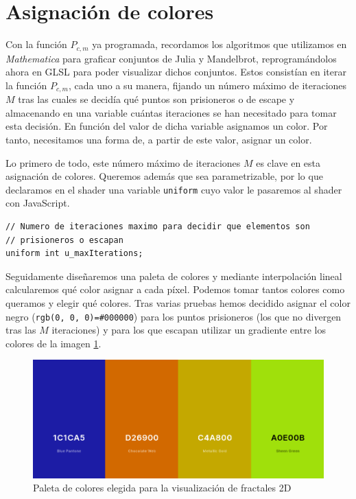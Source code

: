 \section{Asignación de colores}
\label{section:colores}

Con la función $P_{c,m}$ ya programada, recordamos los algoritmos que utilizamos en \textit{Mathematica} para graficar conjuntos de Julia y Mandelbrot, reprogramándolos ahora en GLSL para poder visualizar dichos conjuntos. Estos consistían en iterar la función $P_{c,m}$, cada uno a su manera, fijando un número máximo de iteraciones $M$ tras las cuales se decidía qué puntos son prisioneros o de escape y almacenando en una variable cuántas iteraciones se han necesitado para tomar esta decisión. En función del valor de dicha variable asignamos un color. Por tanto, necesitamos una forma de, a partir de este valor, asignar un color.

Lo primero de todo, este número máximo de iteraciones $M$ es clave en esta asignación de colores. Queremos además que sea parametrizable, por lo que declaramos en el shader una variable \verb|uniform| cuyo valor le pasaremos al shader con JavaScript.

\begin{lstlisting}
// Numero de iteraciones maximo para decidir que elementos son
// prisioneros o escapan
uniform int u_maxIterations;
\end{lstlisting}

Seguidamente diseñaremos una paleta de colores y mediante interpolación lineal calcularemos qué color asignar a cada píxel. Podemos tomar tantos colores como queramos y elegir qué colores. Tras varias pruebas hemos decidido asignar el color negro (\verb|rgb(0, 0, 0)=#000000|) para los puntos prisioneros (los que no divergen tras las $M$ iteraciones) y para los que escapan utilizar un gradiente entre los colores de la imagen \ref{fig:paleta}.

\begin{figure} [ht]
    \centering
    \includegraphics[scale = 0.4]{img/C6/paleta.png}
    \caption{Paleta de colores elegida para la visualización de fractales 2D}
    \label{fig:paleta}
\end{figure}

